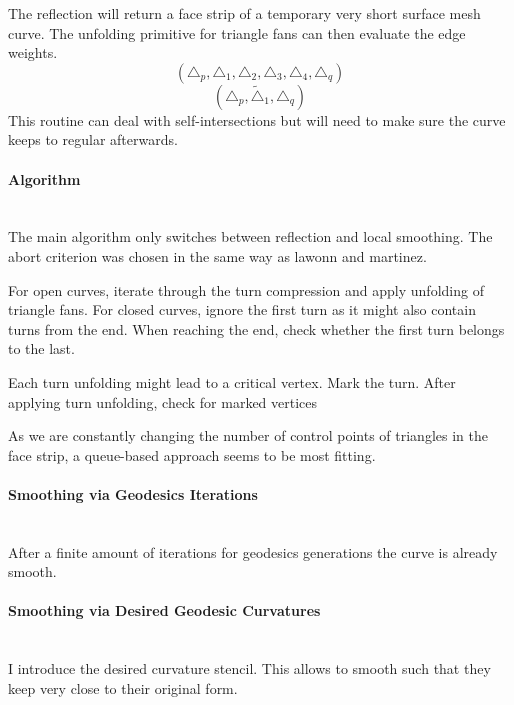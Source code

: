 \documentclass{stdlocal}
\begin{document}
  The reflection will return a face strip of a temporary very short surface mesh curve.
  The unfolding primitive for triangle fans can then evaluate the edge weights.
  \[
    (\triangle_p,\triangle_1,\triangle_2,\triangle_3,\triangle_4,\triangle_q)
  \]
  \[
    (\triangle_p,\tilde{\triangle}_1,\triangle_q)
  \]
  This routine can deal with self-intersections but will need to make sure the curve keeps to regular afterwards.



  \paragraph{Algorithm}\hfill\\
  The main algorithm only switches between reflection and local smoothing.
  The abort criterion was chosen in the same way as lawonn and martinez.

  For open curves, iterate through the turn compression and apply unfolding of triangle fans.
  For closed curves, ignore the first turn as it might also contain turns from the end.
  When reaching the end, check whether the first turn belongs to the last.

  Each turn unfolding might lead to a critical vertex.
  Mark the turn.
  After applying turn unfolding, check for marked vertices

  As we are constantly changing the number of control points of triangles in the face strip, a queue-based approach seems to be most fitting.

  \paragraph{Smoothing via Geodesics Iterations}\hfill\\
  After a finite amount of iterations for geodesics generations the curve is already smooth.

  \paragraph{Smoothing via Desired Geodesic Curvatures}\hfill\\
  I introduce the desired curvature stencil.
  This allows to smooth such that they keep very close to their original form.

\end{document}
